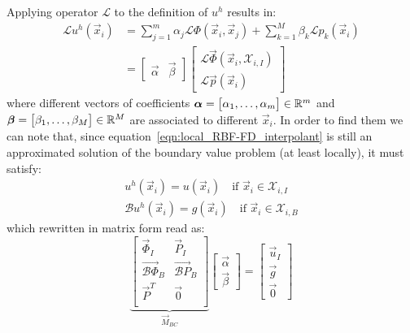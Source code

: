 \medskip
Applying operator $\mathcal{L}$ to the definition of $u^h$ results in:
\begin{equation}
	\label{eqn:L_of_local_RBF-FD_interpolant}
	\begin{aligned}
		\mathcal{L} u^h(\vec{x}_i) & = \sum_{j=1}^{m} \alpha_j \mathcal{L} \Phi(\vec{x}_i, \vec{x}_j) + \sum_{k=1}^{M} \beta_k \mathcal{L} p_k(\vec{x}_i)  \\
								   & = \begin{bmatrix}
								   			\vec{\alpha} & \vec{\beta}
								   	   \end{bmatrix}
							   	   	   \begin{bmatrix}
							   	   	   		\mathcal{L} \vec{\Phi}(\vec{x}_i, \mathcal{X}_{i,I})  \\
							   	   	   		\mathcal{L} \vec{p}(\vec{x}_i)
							   	   	   \end{bmatrix}	
	\end{aligned}
\end{equation}
where different vectors of coefficients $\boldsymbol{\alpha} = \bigl[\alpha_1, \dots, \alpha_m \bigr] \in \mathbb{R}^m$ and $\boldsymbol{\beta} = \bigl[ \beta_1, \dots, \beta_M \bigr] \in \mathbb{R}^M$ are associated to different $\vec{x}_i$.
In order to find them we can note that, since equation~\eqref{eqn:local_RBF-FD_interpolant} is still an approximated solution of the boundary value problem (at least locally), it must satisfy:
\begin{subequations}
\label{eqn:interpolation_conditions_on_PDE}
	\begin{gather}
		u^h(\vec{x}_i) = u(\vec{x}_i) \quad \text{if $\vec{x}_i \in \mathcal{X}_{i,I}$}  \label{eqn:u^h_approx_u_conditions} \\
		\mathcal{B} u^h(\vec{x}_i) = g(\vec{x}_i) \quad \text{if $\vec{x}_i \in \mathcal{X}_{i,B}$} \label{eqn:u^h_approx_conditions_on_boundary}
	\end{gather}
\end{subequations}
which rewritten in matrix form read as:
\begin{equation}
\label{eqn:interpolation_system_of_RBF-FD}
\underbrace{
\begin{bmatrix}
	\vec{\Phi}_I  			 &  \vec{P}_I  			  \\
	\vec{\mathcal{B}\Phi}_B  &  \vec{\mathcal{B}P}_B  \\
	\vec{P}^T				 &  \vec{0}				  \\
\end{bmatrix}}_{\vec{M}_{BC}}
\begin{bmatrix}
	\vec{\alpha}  \\
	\vec{\beta}
\end{bmatrix}
=
\begin{bmatrix}
	\vec{u}_I  \\
	\vec{g}	   \\
	\vec{0}
\end{bmatrix}
\end{equation}
